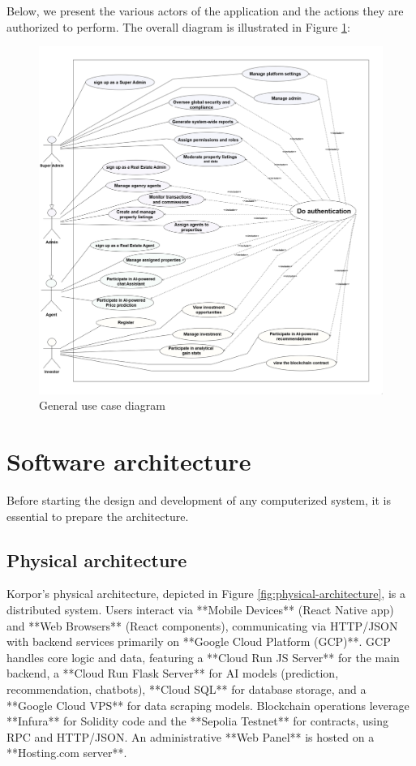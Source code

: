 Below, we present the various actors of the application and the actions they are authorized to perform.
The overall diagram is illustrated in Figure \ref{fig:use-case-diagram}:
\newpage
\begin{figure}[htbp]
    \centering
    \includegraphics[width=1.03\textwidth]{images/diagram de case d utilisation general.png}
    \caption{General use case diagram}
    \label{fig:use-case-diagram}
\end{figure}
\section{Software architecture}

Before starting the design and development of any computerized system, it is essential to prepare the architecture.

\subsection{Physical architecture}

Korpor's physical architecture, depicted in Figure \ref{fig:physical-architecture}, is a distributed system. Users interact via **Mobile Devices** (React Native app) and **Web Browsers** (React components), communicating via HTTP/JSON with backend services primarily on **Google Cloud Platform (GCP)**. GCP handles core logic and data, featuring a **Cloud Run JS Server** for the main backend, a **Cloud Run Flask Server** for AI models (prediction, recommendation, chatbots), **Cloud SQL** for database storage, and a **Google Cloud VPS** for data scraping models. Blockchain operations leverage **Infura** for Solidity code and the **Sepolia Testnet** for contracts, using RPC and HTTP/JSON. An administrative **Web Panel** is hosted on a **Hosting.com server**. 

